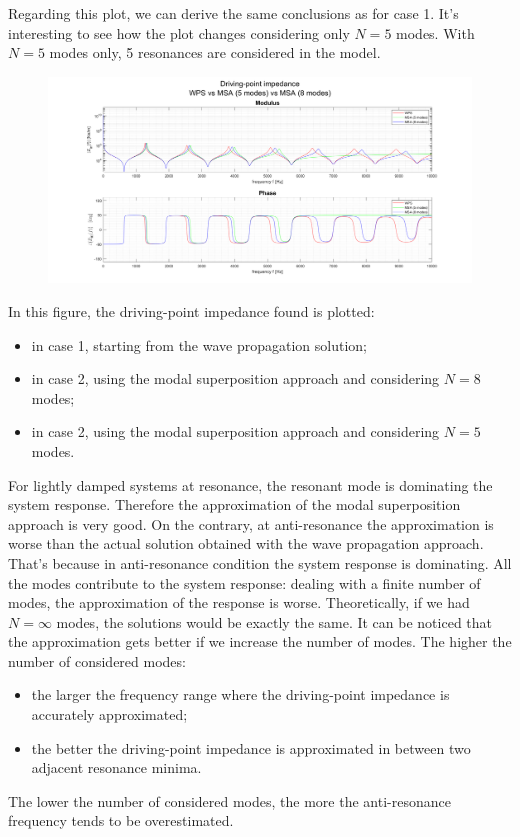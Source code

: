 \documentclass[a4paper,12pt,oneside]{article}
\begin{document}
Regarding this plot, we can derive the same conclusions as for case 1.
It's interesting to see how the plot changes considering only $ N = 5 $ modes. With $ N = 5 $ modes only, 5 resonances are considered in the model.

\begin{figure}[H]
	\hspace{-70pt}
	\includegraphics[scale=0.4]{impedance_wps_vs_msa}
\end{figure}

In this figure, the driving-point impedance found is plotted:

\begin{itemize}
	\item in case 1, starting from the wave propagation solution;
	\item in case 2, using the modal superposition approach and considering $ N = 8 $ modes;
	\item in case 2, using the modal superposition approach and considering $ N = 5 $ modes.
\end{itemize}

For lightly damped systems at resonance, the resonant mode is dominating the
system response. Therefore the approximation of the modal superposition approach is very good. On the contrary, at anti-resonance the approximation is worse than the actual solution obtained with the wave propagation approach. That's because in anti-resonance condition the system response is dominating. All the modes contribute to the system response: dealing with a finite number of modes, the approximation of the response is worse. Theoretically, if we had $ N = \infty $ modes, the solutions would be exactly the same. It can be noticed that the approximation gets better if we increase the number of modes.
The higher the number of considered modes:

\begin{itemize}
	\item the larger the frequency range where the driving-point impedance is accurately approximated;
	\item the better the driving-point impedance is approximated in between two adjacent resonance minima.
\end{itemize}

The lower the number of considered modes, the more the anti-resonance frequency tends to be overestimated.
\end{document}
